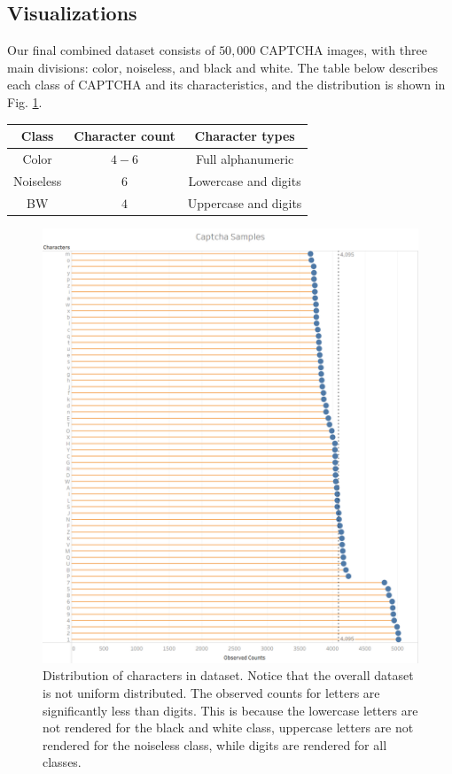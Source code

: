 \documentclass[twocolumn,10pt]{article}
\begin{document}
\subsection{Visualizations}
    
Our final combined dataset consists of $50,000$ CAPTCHA images, with three main divisions: color, noiseless, and black and white. The table below describes each class of CAPTCHA and its characteristics, and the distribution is shown in Fig. \ref{fig:distribution}.
\begin{center}
\begin{tabular}{|c|c|c|} 
\hline
Class & Character count & Character types\\
\hline
Color & $4-6$ & Full alphanumeric\\
Noiseless & $6$ & Lowercase and digits\\
BW & $4$ & Uppercase and digits\\
\hline
\end{tabular}
\end{center}

\begin{center}
\begin{figure}
  \includegraphics[width=\textwidth]{samples.png}
  \caption{Distribution of characters in dataset. Notice that the overall dataset is not uniform distributed. The observed counts for letters are significantly less than digits. This is because the lowercase letters are not rendered for the black and white class, uppercase letters are not rendered for the noiseless class, while digits are rendered for all classes. 
}
  \label{fig:distribution}
\end{figure}
\end{center}
\end{document}
